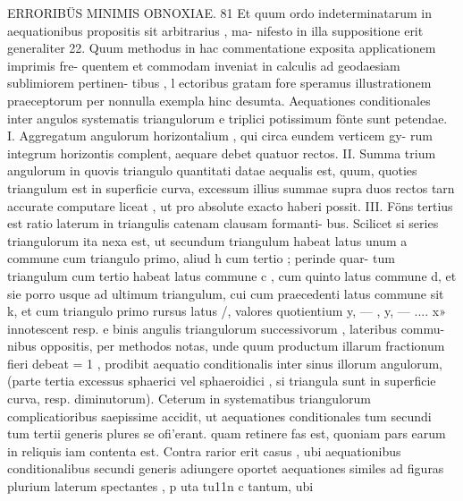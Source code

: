 \documentclass[12pt,a4paper]{article}
\begin{document}
\newpage
ERRORIBÜS MINIMIS OBNOXIAE. 81
Et quum ordo indeterminatarum in aequationibus propositis sit arbitrarius , ma-
nifesto in illa suppositione erit generaliter
22.
Quum methodus in hac commentatione exposita applicationem imprimis fre-
quentem et commodam inveniat in calculis ad geodaesiam sublimiorem pertinen-
tibus , l ectoribus gratam fore speramus illustrationem praeceptorum per nonnulla
exempla hinc desumta.
Aequationes conditionales inter angulos systematis triangulorum e triplici
potissimum fönte sunt petendae.
I. Aggregatum angulorum horizontalium , qui circa eundem verticem gy-
rum integrum horizontis complent, aequare debet quatuor rectos.
II. Summa trium angulorum in quovis triangulo quantitati datae aequalis
est, quum, quoties triangulum est in superficie curva, excessum illius summae
supra duos rectos tarn accurate computare liceat , ut pro absolute exacto haberi
possit.
III. Föns tertius est ratio laterum in triangulis catenam clausam formanti-
bus. Scilicet si series triangulorum ita nexa est, ut secundum triangulum habeat
latus unum a commune cum triangulo primo, aliud h cum tertio ; perinde quar-
tum triangulum cum tertio habeat latus commune c , cum quinto latus commune
d, et sie porro usque ad ultimum triangulum, cui cum praecedenti latus commune
sit k, et cum triangulo primo rursus latus /, valores quotientium y, --- , y, --- .... x»
innotescent resp. e binis angulis triangulorum successivorum , lateribus commu-
nibus oppositis, per methodos notas, unde quum productum illarum fractionum
fieri debeat = 1 , prodibit aequatio conditionalis inter sinus illorum angulorum,
(parte tertia excessus sphaerici vel sphaeroidici , si triangula sunt in superficie
curva, resp. diminutorum).
Ceterum in systematibus triangulorum complicatioribus saepissime accidit,
ut aequationes conditionales tum secundi tum tertii generis plures se ofi'erant. quam
retinere fas est, quoniam pars earum in reliquis iam contenta est. Contra rarior
erit casus , ubi aequationibus conditionalibus secundi generis adiungere oportet
aequationes similes ad figuras plurium laterum spectantes , p uta tu11n c tantum, ubi
\end{document}
